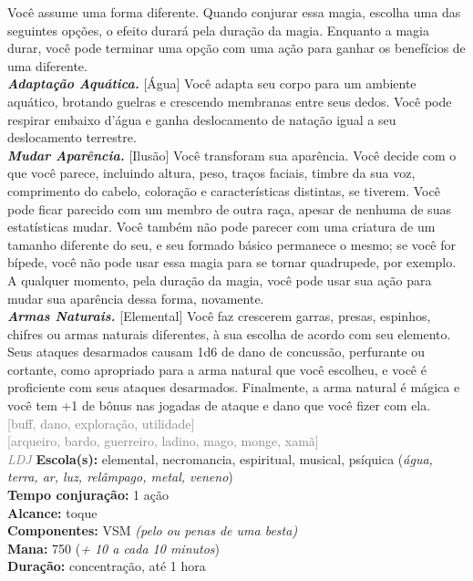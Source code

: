 \documentclass{RPG_Adventure}[2021/10/20]
\begin{document}
{\normalsize Você assume uma forma diferente. Quando conjurar essa magia, escolha uma das seguintes opções, o efeito durará pela duração da magia. Enquanto a magia durar, você pode terminar uma opção com uma ação para ganhar os benefícios de uma diferente.\\\t \textbf{\textit{Adaptação Aquática.}} [Água] Você adapta seu corpo para um ambiente aquático, brotando guelras e crescendo membranas entre seus dedos. Você pode respirar embaixo d’água e ganha deslocamento de natação igual a seu deslocamento terrestre.\\\t \textbf{\textit{Mudar Aparência.}} [Ilusão] Você transforam sua aparência. Você decide com o que você parece, incluindo altura, peso, traços faciais, timbre da sua voz, comprimento do cabelo, coloração e características distintas, se tiverem. Você pode ficar parecido com um membro de outra raça, apesar de nenhuma de suas estatísticas mudar. Você também não pode parecer com uma criatura de um tamanho diferente do seu, e seu formado básico permanece o mesmo; se você for bípede, você não pode usar essa magia para se tornar quadrupede, por exemplo. A qualquer momento, pela duração da magia, você pode usar sua ação para mudar sua aparência dessa forma, novamente.\\\t \textbf{\textit{Armas Naturais.}} [Elemental] Você faz crescerem garras, presas, espinhos, chifres ou armas naturais diferentes, à sua escolha de acordo com seu elemento. Seus ataques desarmados causam 1d6 de dano de concussão, perfurante ou cortante, como apropriado para a arma natural que você escolheu, e você é proficiente com seus ataques desarmados. Finalmente, a arma natural é mágica e você tem +1 de bônus nas jogadas de ataque e dano que você fizer com ela.\\}
{\scriptsize \textcolor{gray}{[buff, dano, exploração, utilidade]\\}}
{\scriptsize \textcolor{gray}{[arqueiro, bardo, guerreiro, ladino, mago, monge, xamã]\\}}
{\tiny \textcolor{gray}{\textit{LDJ}}}\jump{}
{\small \t \textbf{Escola(s):} elemental, necromancia, espiritual, musical, psíquica (\textit{água, terra, ar, luz, relâmpago, metal, veneno})\\\t \textbf{Tempo conjuração:} 1 ação\\\t \textbf{Alcance:} toque\\\t \textbf{Componentes:} VSM \textit{(pelo ou penas de uma besta)}\\\t \textbf{Mana:} 750 (\textit{+ 10 a cada 10 minutos})\\\t \textbf{Duração:} concentração, até 1 hora\\}
\end{document}
